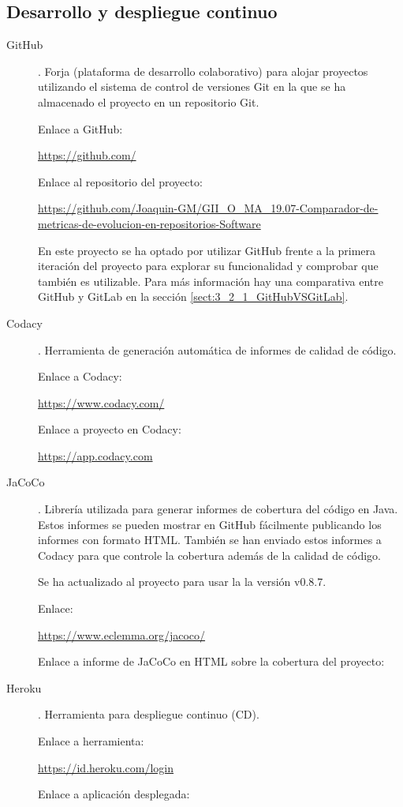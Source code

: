 \subsection{Desarrollo y despliegue continuo}
\begin{description}
	\item[GitHub]. Forja (plataforma de desarrollo colaborativo) para alojar proyectos utilizando el sistema de control de versiones Git en la que se ha almacenado el proyecto en un repositorio Git.
	
		Enlace a GitHub:
		
		\url{https://github.com/}
		
		Enlace al repositorio del proyecto:
		
		\url{https://github.com/Joaquin-GM/GII_O_MA_19.07-Comparador-de-metricas-de-evolucion-en-repositorios-Software}
		
		En este proyecto se ha optado por utilizar GitHub frente a la primera iteración del proyecto \cite{TFGPrevio} para explorar su funcionalidad y comprobar que también es utilizable. Para más información hay una comparativa entre GitHub y GitLab en la sección \ref{sect:3_2_1_GitHubVSGitLab}.
		
	\item[Codacy]. Herramienta de generación automática de informes de calidad de código.
	
		 Enlace a Codacy:
		 
		 \url{https://www.codacy.com/}
		 
		 Enlace a proyecto en Codacy: 
		 
		 \url{https://app.codacy.com}
	
	\item[JaCoCo]. Librería utilizada para generar informes de cobertura del código en Java. Estos informes se pueden mostrar en GitHub fácilmente publicando los informes con formato HTML. También se han enviado estos informes a Codacy para que controle la cobertura además de la calidad de código.
	
		Se ha actualizado al proyecto para usar la la versión v0.8.7. 
		
		Enlace:
		
		\url{https://www.eclemma.org/jacoco/}
		
		Enlace a informe de JaCoCo en HTML sobre la cobertura del proyecto:
		
	
	\item[Heroku]. Herramienta para despliegue continuo (CD).
	
		Enlace a herramienta:
		
		\url{https://id.heroku.com/login}
		
		Enlace a aplicación desplegada:
		
	
\end{description}
